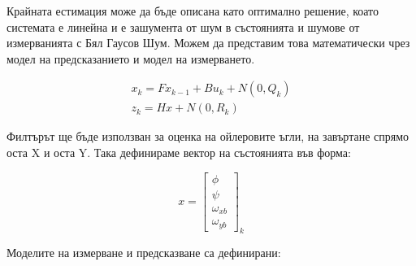 Крайната естимация може да бъде описана като оптимално решение,
коато системата е линейна и е зашумента от шум в състоянията и шумове от измерванията с Бял Гаусов Шум.
Можем да представим това математически чрез модел на предсказанието 
и модел на измерването.

\begin{align}
    x_k = F x_{k-1} + B u_k + N(0, Q_k) \\
    z_k = H x + N(0, R_k)
\end{align}

Филтърът ще бъде използван за оценка на ойлеровите ъгли, на завъртане спрямо оста X и оста Y.
Така дефинираме вектор на състоянията във форма:

\begin{equation*}
    x = 
    \begin{bmatrix}
        \phi\\
        \psi\\
        \omega_{xb}\\
        \omega_{yb}
    \end{bmatrix}_k
\end{equation*}

Моделите на измерване и предсказване са дефинирани:


